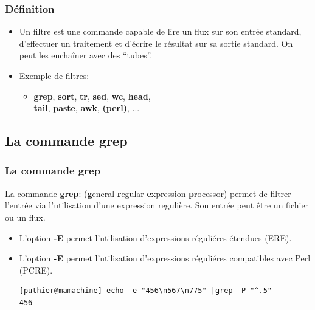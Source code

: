 \documentclass[10pt, xcolor=dvipsnames]{beamer}
\begin{document}
\begin{frame}[fragile]
\frametitle{Définition}
\begin{itemize}
  \item Un filtre est une commande capable de lire un flux sur son entrée standard, d'effectuer un traitement et d'écrire le résultat sur sa sortie standard. On peut les enchaîner avec des ``tubes''.
 
\item Exemple de filtres:
            \begin{itemize}
             \item  \textbf{grep}, \textbf{sort}, \textbf{tr}, \textbf{sed}, \textbf{wc}, \textbf{head},\\ \textbf{tail}, \textbf{paste}, \textbf{awk}, \textbf{(perl)}, ...
            \end{itemize}

\end{itemize}

\end{frame}
 
\subsection{La commande grep}

\begin{frame}[fragile]

\frametitle{La commande grep}

    La commande \textbf{grep}: (\textbf{g}eneral \textbf{r}egular \textbf{e}xpression \textbf{p}rocessor) permet de filtrer l'entrée via l'utilisation d'une expression regulière. Son entrée peut être un fichier ou un flux.


    
        \begin{itemize}
            \item L'option \textbf{-E} permet l'utilisation d'expressions réguliéres étendues (ERE).
            \item L'option \textbf{-E} permet l'utilisation d'expressions réguliéres compatibles avec Perl (PCRE).
            \begin{verbatim}
[puthier@mamachine] echo -e "456\n567\n775" |grep -P "^.5"
456
            \end{verbatim}
        \end{itemize}


\end{frame}
\end{document}
